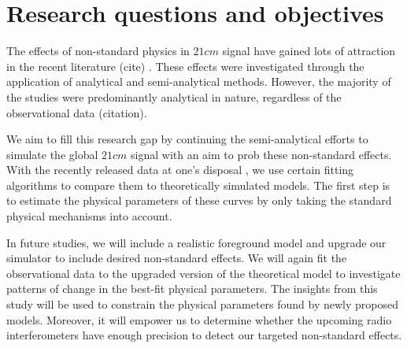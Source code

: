 \documentclass[12pt, TexShade, letterpaper]{report}
\begin{document}
\section{Research questions and objectives}
The effects of non-standard physics in $21cm$ signal have gained lots of attraction in the recent literature (cite) . These effects were investigated through the application of analytical and semi-analytical methods. However, the majority of the studies were predominantly analytical in nature, regardless of the observational data (citation).\par {}
We aim to fill this research gap by continuing the semi-analytical efforts to simulate the global $21cm$ signal with an aim to prob these non-standard effects. With the recently released data at one's disposal \cite{edges}, we use certain fitting algorithms to compare them to theoretically simulated models\cite{ares2014jordan}. 
The first step is to estimate the physical parameters of these curves by only taking the standard physical mechanisms into account.\par
In future studies, we will include a realistic foreground model and upgrade our simulator to include desired non-standard effects. We will again fit the observational data to the upgraded version of the theoretical model to investigate patterns of change in the best-fit physical parameters. The insights from this study will be used to constrain the physical parameters found by newly proposed models. Moreover, it will empower us to determine whether the upcoming radio interferometers have enough precision to detect our targeted non-standard effects.\par
\end{document}
